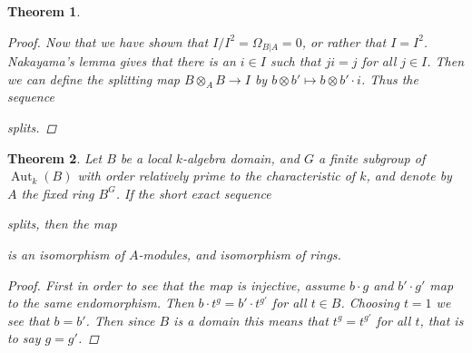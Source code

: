 \documentclass[11pt, a4paper, english]{article}
\newtheorem{theorem}{Theorem}[section]
\theoremstyle{definition}
\DeclareMathOperator{\End}{End}
\DeclareMathOperator{\Aut}{Aut}
\begin{document}
\begin{theorem}
\begin{proof}
Now that we have shown that $I/I^2 = \Omega_{B|A} = 0$, or rather that $I = I^2$. Nakayama's lemma gives that there is an $i \in I$ such that $ji = j$ for all $j \in I$. Then we can define the splitting map $B \otimes_A B \to I$ by $b \otimes b' \mapsto b \otimes b' \cdot i$. Thus the sequence
\begin{center}
\end{center}
splits.
\end{proof}
\end{theorem}

\begin{theorem}
\label{thm:separable_implies_ringiso}
Let $B$ be a local $k$-algebra domain, and $G$ a finite subgroup of $\Aut_k(B)$ with order relatively prime to the characteristic of $k$, and denote by $A$ the fixed ring $B^G$. If the short exact sequence
\begin{center}
\end{center}
splits, then the map
\begin{center}
\end{center}
is an isomorphism of $A$-modules, and isomorphism of rings.

\begin{proof}
First in order to see that the map is injective, assume $b \cdot g$ and $b' \cdot g'$ map to the same endomorphism. Then $b \cdot t^g = b' \cdot t^{g'}$ for all $t \in B$. Choosing $t=1$ we see that $b = b'$. Then since $B$ is a domain this means that $t^g = t^{g'}$ for all $t$, that is to say $g = g'$.


\end{proof}
\end{theorem}
\end{document}
